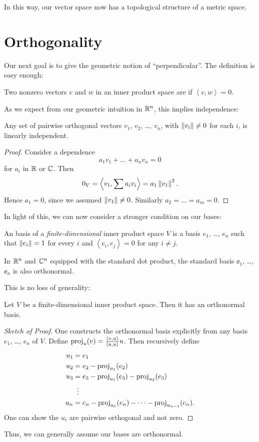 In this way, our vector space now has a topological structure of a metric space.

\section{Orthogonality}
Our next goal is to give the geometric notion of ``perpendicular''.
The definition is easy enough:
\begin{definition}
	Two nonzero vectors $v$ and $w$ in an inner product space
	are  if $\left< v,w \right> = 0$.
\end{definition}

As we expect from our geometric intuition in $\mathbb R^n$,
this implies independence:
\begin{lemma}
	Any set of pairwise orthogonal vectors $v_1$, $v_2$, \dots, $v_n$,
	with $\left\lVert v_i \right\rVert \ne 0$ for each $i$,
	is linearly independent.
\end{lemma}
\begin{proof}
	Consider a dependence
	\[ a_1 v_1 + \dots + a_n v_n = 0 \]
	for $a_i$ in $\mathbb R$ or $\mathbb C$.
	Then \[ 0_V = \left< v_1, \sum a_i v_i \right> = a_1 \left\lVert v_1 \right\rVert^2. \]
	Hence $a_1 = 0$, since we assumed $\left\lVert v_1 \right\rVert \neq 0$.
	Similarly $a_2 = \dots = a_m = 0$.
\end{proof}

In light of this, we can now consider a stronger condition on our bases:
\begin{definition}
	An  basis of a
	\emph{finite-dimensional} inner product space $V$
	is a basis $e_1$, \dots, $e_n$ such that
	$\left\lVert e_i \right\rVert = 1$ for every $i$ and
	$\left< e_i, e_j \right> = 0$ for any $i \neq j$.
\end{definition}
\begin{example}
	In $\mathbb R^n$ and $\mathbb C^n$ equipped with the standard dot product,
	the standard basis $\ee_1$, \dots, $\ee_n$ is also orthonormal.
\end{example}
This is no loss of generality:
\begin{theorem}
	Let $V$ be a finite-dimensional inner product space.
	Then it has an orthonormal basis.
\end{theorem}
\begin{proof}[Sketch of Proof]
	One constructs the orthonormal basis explicitly from any basis
	$e_1$, \dots, $e_n$ of $V$.
	Define $\operatorname{proj}_u(v) = \frac{\left< v,u\right>}{\left< u,u\right>} u$.
	Then recursively define
	\begin{align*}
		u_1 &= e_1 \\
		u_2 &= e_2 - \opname{proj}_{u_1}(e_2) \\
		u_3 &= e_3 - \opname{proj}_{u_1}(e_3) - \opname{proj}_{u_2}(e_3) \\
		&\vdotswithin{=} \\
		u_n &= e_n - \opname{proj}_{u_1}(e_n) - \dots - \opname{proj}_{u_{n-1}}(e_n).
	\end{align*}
	One can show the $u_i$ are pairwise orthogonal and not zero.
\end{proof}
Thus, we can generally assume our bases are orthonormal.

